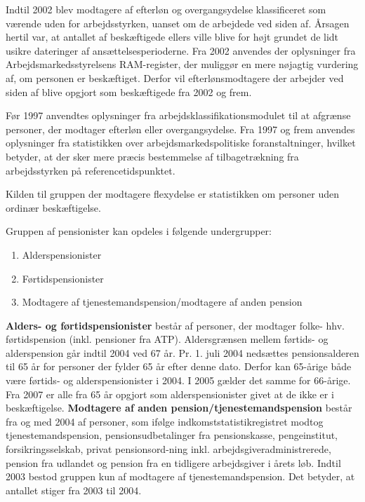 Indtil 2002 blev modtagere af efterløn og overgangsydelse klassificeret som værende uden for arbejdsstyrken, uanset om de arbejdede ved siden af. Årsagen hertil var, at antallet af beskæftigede ellers ville blive for højt grundet de lidt usikre dateringer af ansættelsesperioderne. Fra 2002 anvendes der oplysninger fra Arbejdsmarkedsstyrelsens RAM-register, der muliggør en mere nøjagtig vurdering af, om personen er beskæftiget. Derfor vil efterlønsmodtagere der arbejder ved siden af blive opgjort som beskæftigede fra 2002 og frem.

Før 1997 anvendtes oplysninger fra arbejdsklassifikationsmodulet til at afgrænse personer, der modtager efterløn eller overgangsydelse. Fra 1997 og frem anvendes oplysninger fra statistikken over arbejdsmarkedspolitiske foranstaltninger, hvilket betyder, at der sker mere præcis bestemmelse af tilbagetrækning fra arbejdsstyrken på referencetidspunktet.

Kilden til gruppen der modtagere flexydelse er statistikken om personer uden ordinær beskæftigelse.

Gruppen af pensionister kan opdeles i følgende undergrupper:
\begin{enumerate} [topsep=6pt,itemsep=-1ex]
  \item Alderspensionister
  \item Førtidspensionister
  \item Modtagere af tjenestemandspension/modtagere af anden pension
\end{enumerate}

\textbf{Alders- og førtidspensionister} består af personer, der modtager folke- hhv. førtidspension (inkl. pensioner fra ATP). Aldersgrænsen mellem førtids- og alderspension går indtil 2004 ved 67 år. Pr. 1. juli 2004 nedsættes pensionsalderen til 65 år for personer der fylder 65 år efter denne dato. Derfor kan 65-årige både være førtids- og alderspensionister i 2004. I 2005 gælder det samme for 66-årige. Fra 2007 er alle fra 65 år opgjort som alderspensionister givet at de ikke er i beskæftigelse. \textbf{Modtagere af anden pension/tjenestemandspension} består fra og med 2004 af personer, som ifølge indkomststatistikregistret modtog tjenestemandspension, pensionsudbetalinger fra pensionskasse, pengeinstitut, forsikringsselskab, privat pensionsord-ning inkl. arbejdsgiveradministrerede, pension fra udlandet og pension fra en tidligere arbejdsgiver i årets løb. Indtil 2003 bestod gruppen kun af modtagere af tjenestemandspension. Det betyder, at antallet stiger fra 2003 til 2004.

